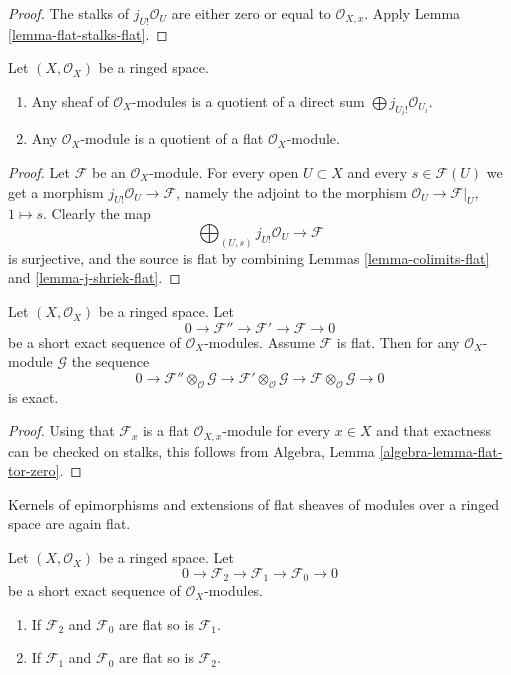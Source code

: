 \begin{proof}
The stalks of $j_{U!}\mathcal{O}_U$ are either zero or equal
to $\mathcal{O}_{X, x}$. Apply
Lemma \ref{lemma-flat-stalks-flat}.
\end{proof}

\begin{lemma}
\label{lemma-module-quotient-flat}
Let $(X, \mathcal{O}_X)$ be a ringed space.
\begin{enumerate}
\item Any sheaf of $\mathcal{O}_X$-modules is a quotient of
a direct sum $\bigoplus j_{U_i!}\mathcal{O}_{U_i}$.
\item Any $\mathcal{O}_X$-module is a quotient of
a flat $\mathcal{O}_X$-module.
\end{enumerate}
\end{lemma}

\begin{proof}
Let $\mathcal{F}$ be an $\mathcal{O}_X$-module.
For every open $U \subset X$ and every
$s \in \mathcal{F}(U)$ we get a morphism
$j_{U!}\mathcal{O}_U \to \mathcal{F}$, namely the adjoint to
the morphism $\mathcal{O}_U \to \mathcal{F}|_U$, $1 \mapsto s$.
Clearly the map
$$
\bigoplus\nolimits_{(U, s)} j_{U!}\mathcal{O}_U
\longrightarrow
\mathcal{F}
$$
is surjective, and the source is flat by combining Lemmas
\ref{lemma-colimits-flat} and \ref{lemma-j-shriek-flat}.
\end{proof}

\begin{lemma}
\label{lemma-flat-tor-zero}
Let $(X, \mathcal{O}_X)$ be a ringed space.
Let
$$
0 \to \mathcal{F}'' \to \mathcal{F}' \to \mathcal{F} \to 0
$$
be a short exact sequence of $\mathcal{O}_X$-modules.
Assume $\mathcal{F}$ is flat. Then for any $\mathcal{O}_X$-module
$\mathcal{G}$ the sequence
$$
0 \to
\mathcal{F}'' \otimes_\mathcal{O} \mathcal{G} \to
\mathcal{F}' \otimes_\mathcal{O} \mathcal{G} \to
\mathcal{F} \otimes_\mathcal{O} \mathcal{G} \to 0
$$
is exact.
\end{lemma}

\begin{proof}
Using that $\mathcal{F}_x$ is a flat $\mathcal{O}_{X, x}$-module
for every $x \in X$ and that exactness can be checked on stalks, this
follows from
Algebra, Lemma \ref{algebra-lemma-flat-tor-zero}.
\end{proof}

\begin{lemma}
\label{lemma-flat-ses}
\begin{slogan}
Kernels of epimorphisms and extensions of flat sheaves of modules over
a ringed space are again flat.
\end{slogan}
Let $(X, \mathcal{O}_X)$ be a ringed space.
Let
$$
0 \to
\mathcal{F}_2 \to
\mathcal{F}_1 \to
\mathcal{F}_0 \to 0
$$
be a short exact sequence of $\mathcal{O}_X$-modules.
\begin{enumerate}
\item If $\mathcal{F}_2$ and $\mathcal{F}_0$ are flat so is
$\mathcal{F}_1$.
\item If $\mathcal{F}_1$ and $\mathcal{F}_0$ are flat so is
$\mathcal{F}_2$.
\end{enumerate}
\end{lemma}

